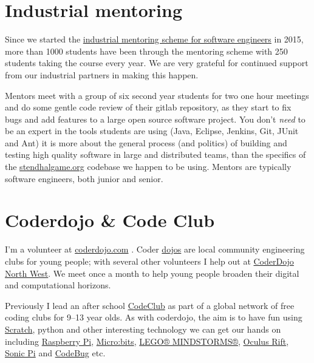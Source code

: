 \documentclass[
  12pt,
]{book}
\begin{document}
\hypertarget{industrial-mentoring}{%
\section{Industrial mentoring}\label{industrial-mentoring}}

Since we started the \href{https://www.cs.manchester.ac.uk/connect/business-engagement/industrial-mentoring/}{industrial mentoring scheme for software engineers} in 2015, more than 1000 students have been through the mentoring scheme with 250 students taking the course every year. We are very grateful for continued support from our industrial partners in making this happen.

Mentors meet with a group of six second year students for two one hour meetings and do some gentle code review of their gitlab repository, as they start to fix bugs and add features to a large open source software project. You don't \emph{need} to be an expert in the tools students are using (Java, Eclipse, Jenkins, Git, JUnit and Ant) it is more about the general process (and politics) of building and testing high quality software in large and distributed teams, than the specifics of the \href{https://stendhalgame.org/}{stendhalgame.org} codebase we happen to be using. Mentors are typically software engineers, both junior and senior.

\hypertarget{codeclub}{%
\section{Coderdojo \& Code Club}\label{codeclub}}

I'm a volunteer at \href{https://coderdojo.com/}{coderdojo.com} \citep{coderdojo}. Coder \href{https://en.wikipedia.org/wiki/Dojo}{dojos} are local community engineering clubs for young people; with several other volunteers I help out at \href{https://twitter.com/coderdojonw}{CoderDojo North West}. We meet once a month to help young people broaden their digital and computational horizons.

Previously I lead an after school \href{https://codeclub.org}{CodeClub} as part of a global network of free coding clubs for 9--13 year olds. \citep{codeclub} As with coderdojo, the aim is to have fun using \href{https://scratch.mit.edu/}{Scratch}, \citep{Resnick2009} python and other interesting technology we can get our hands on including \href{https://www.raspberrypi.org/}{Raspberry Pi}, \citep{raspberrypi} \href{https://microbit.org/}{Micro:bits}, \citep{Sentance2017} \href{https://www.lego.com/en-gb/themes/mindstorms}{LEGO® MINDSTORMS®}, \citep{Papert1980, Klassner2003} \href{https://www.oculus.com}{Oculus Rift}, \href{https://sonic-pi.net/}{Sonic Pi} \citep{Aaron2016} and \href{http://www.codebug.org.uk/}{CodeBug} etc.
\end{document}
